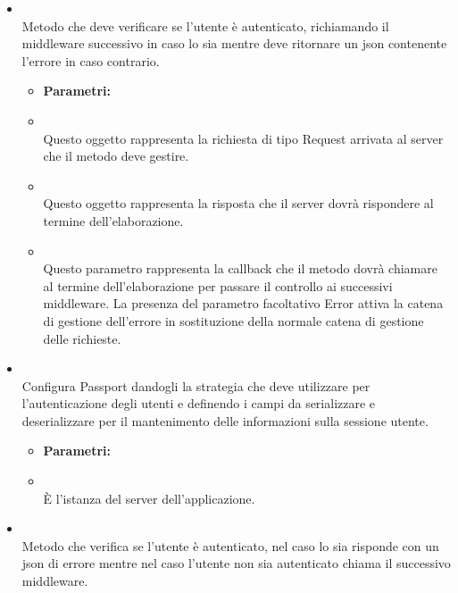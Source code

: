\begin{itemize}
\begin{itemize}
\end{itemize}
\item[] \textbf{} \\ Metodo che deve verificare se l'utente è autenticato, richiamando il middleware successivo in caso lo sia mentre deve ritornare un json contenente l'errore in caso contrario.
\begin{itemize}\addtolength{\itemsep}{-0.5\baselineskip}
\item[] \textbf{Parametri:}
\item[]  \\ Questo oggetto rappresenta la richiesta di tipo Request arrivata al server che il metodo deve gestire.
\item[]  \\ Questo oggetto rappresenta la risposta che il server dovrà rispondere al termine dell'elaborazione.
\item[]  \\ Questo parametro rappresenta la callback che il metodo dovrà chiamare al termine dell'elaborazione per passare il controllo ai successivi middleware. La presenza del parametro facoltativo Error attiva la catena di gestione dell'errore in sostituzione della normale catena di gestione delle richieste.
\end{itemize}
\item[] \textbf{} \\ Configura Passport dandogli la strategia che deve utilizzare per l'autenticazione degli utenti e definendo i campi da serializzare e deserializzare per il mantenimento delle informazioni sulla sessione utente.
\begin{itemize}\addtolength{\itemsep}{-0.5\baselineskip}
\item[] \textbf{Parametri:}
\item[]  \\ È l'istanza del server dell'applicazione.
\end{itemize}
\item[] \textbf{} \\ Metodo che verifica se l'utente è autenticato, nel caso lo sia risponde con un json di errore mentre nel caso l'utente non sia autenticato chiama il successivo middleware.
\begin{itemize}\addtolength{\itemsep}{-0.5\baselineskip}

\end{itemize}
\end{itemize}
